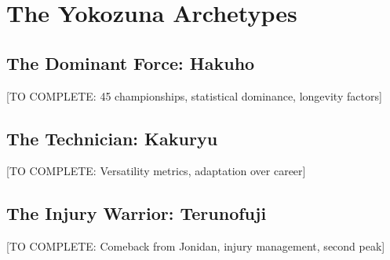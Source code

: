 \section{The Yokozuna Archetypes}

\subsection{The Dominant Force: Hakuho}

[TO COMPLETE: 45 championships, statistical dominance, longevity factors]

\subsection{The Technician: Kakuryu}

[TO COMPLETE: Versatility metrics, adaptation over career]

\subsection{The Injury Warrior: Terunofuji}

[TO COMPLETE: Comeback from Jonidan, injury management, second peak]